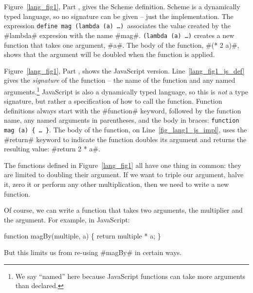 \documentclass[12pt]{report}
\begin{document}
Figure~\ref{lang_fig1}, Part , gives the
Scheme definition. Scheme is a dynamically typed language, so no
signature can be given -- just the implementation. The expression
\texttt{define mag (lambda (a) \ldots)}\ associates the value created by
the #lambda# expresion with the name #mag#. \texttt{(lambda (a)
  \ldots)} creates a new function that takes one argument, #a#.  The
body of the function, #(* 2 a)#, shows that the argument will be
doubled when the function is applied.


Figure~\ref{lang_fig1}, Part , shows the
JavaScript version. Line~\ref{lang_fig1_js_def} gives the
\emph{signature} of the function -- the name of the function and any
named arguments.\footnote{We say ``named'' here because JavaScript
  functions can take more arguments than declared.}  JavaScript is
also a dynamically typed language, so this is \emph{not} a type
signature, but rather a specification of how to call the
function. Function definitions always start with the #function#
keyword, followed by the function name, any named arguments in
parentheses, and the body in braces: \texttt{function mag (a) \{
  \ldots\ \}}. The body of the function, on
Line~\ref{fig_lang1_js_impl}, uses the #return# keyword to
indicate the function doubles its argument and returns the resulting
value: #return 2 * a#.

The functions defined in Figure~\ref{lang_fig1} all have one thing in
common: they are limited to doubling their argument. If we want to
triple our argument, halve it, zero it or perform any other
multiplication, then we need to write a new function.

Of course, we can write a function that takes two arguments, the
multiplier and the argument. For example, in JavaScript:
\begin{AVerb}
function magBy(multiple, a) \{
  return multiple * a;
\}
\end{AVerb}
But this limits us from re-using #magBy# in certain ways. 
\end{document}
